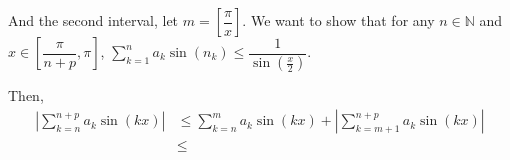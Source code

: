 \documentclass[12pt]{article}
\begin{document}
\begin{enumerate}
\begin{enumerate}
        \newpage
        And the second interval, let $m = [\dfrac{\pi}{x}]$.
        We want to show that for any $n\in\mathbb{N}$ and $x\in [\dfrac{\pi}{n+p}, \pi]$, $\displaystyle\sum_{k=1}^{n} a_k \sin(n_k) \leq \dfrac{1}{\sin(\frac{x}{2})}$.




        Then, \begin{align*}
            |\sum_{k=n}^{n+p} a_k \sin(kx)| &\leq \sum_{k=n}^{m} a_k \sin(kx) + |\sum_{k=m+1}^{n+p} a_k\sin(kx)|\\
            & \leq 
        \end{align*}
        
    \end{enumerate}
\end{enumerate}
\end{document}
